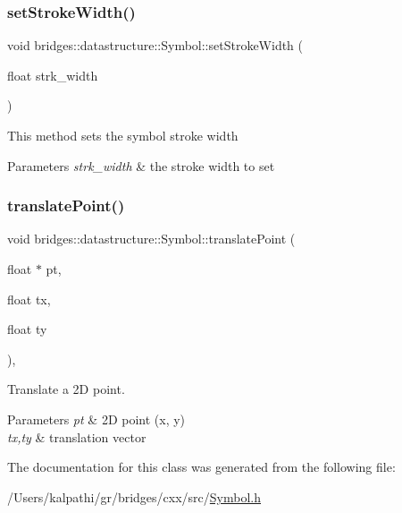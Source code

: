 \subsubsection{\texorpdfstring{setStrokeWidth()}{setStrokeWidth()}}
{\footnotesize\ttfamily void bridges\+::datastructure\+::\+Symbol\+::set\+Stroke\+Width (\begin{DoxyParamCaption}\item[{float}]{strk\+\_\+width }\end{DoxyParamCaption})\hspace{0.3cm}{\ttfamily [inline]}}

This method sets the symbol stroke width


\begin{DoxyParams}{Parameters}
{\em strk\+\_\+width} & the stroke width to set \\
\hline
\end{DoxyParams}
\mbox{\label{classbridges_1_1datastructure_1_1_symbol_a3331549f82faa00d8fee5f51ca547cb0}} 
\subsubsection{\texorpdfstring{translatePoint()}{translatePoint()}}
{\footnotesize\ttfamily void bridges\+::datastructure\+::\+Symbol\+::translate\+Point (\begin{DoxyParamCaption}\item[{float $\ast$}]{pt,  }\item[{float}]{tx,  }\item[{float}]{ty }\end{DoxyParamCaption})\hspace{0.3cm}{\ttfamily [inline]}, {\ttfamily [protected]}}



Translate a 2D point. 


\begin{DoxyParams}{Parameters}
{\em pt} & 2D point (x, y) \\
\hline
{\em tx,ty} & translation vector \\
\hline
\end{DoxyParams}


The documentation for this class was generated from the following file\+:\begin{DoxyCompactItemize}
\item 
/\+Users/kalpathi/gr/bridges/cxx/src/\mbox{\hyperlink{_symbol_8h}{Symbol.\+h}}\end{DoxyCompactItemize}
